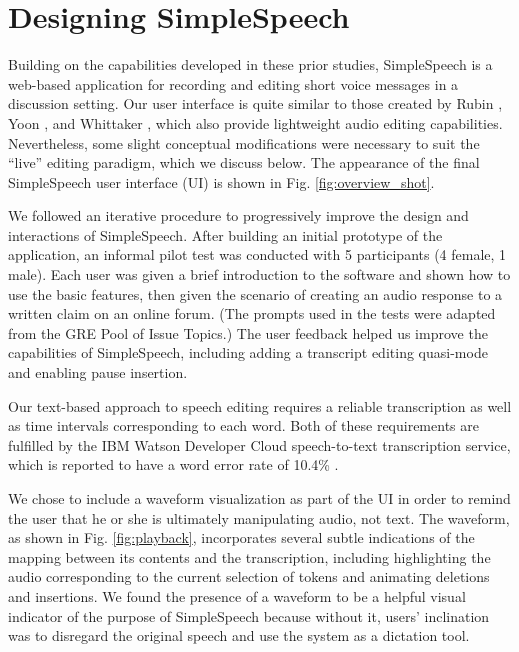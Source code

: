 \section{Designing SimpleSpeech}
Building on the capabilities developed in these prior studies, SimpleSpeech is a web-based application for recording and editing short voice messages in a discussion setting.
Our user interface is quite similar to those created by Rubin \cite{rubin}, Yoon \cite{yoon}, and Whittaker \cite{whittaker_semantic}, which also provide lightweight audio editing capabilities.
Nevertheless, some slight conceptual modifications were necessary to suit the ``live'' editing paradigm, which we discuss below.
The appearance of the final SimpleSpeech user interface (UI) is shown in Fig. \ref{fig:overview_shot}.

We followed an iterative procedure to progressively improve the design and interactions of SimpleSpeech.
After building an initial prototype of the application, an informal pilot test was conducted with 5 participants (4 female, 1 male). 
Each user was given a brief introduction to the software and shown how to use the basic features, then given the scenario of creating an audio response to a written claim on an online forum. 
(The prompts used in the tests were adapted from the GRE Pool of Issue Topics.)
The user feedback helped us improve the capabilities of SimpleSpeech, including adding a transcript editing quasi-mode and enabling pause insertion.

Our text-based approach to speech editing requires a reliable transcription as well as time intervals corresponding to each word.
Both of these requirements are fulfilled by the IBM Watson Developer Cloud speech-to-text transcription service, which is reported to have a word error rate of 10.4\% \cite{soltau:2014}.

 We chose to include a waveform visualization as part of the UI in order to remind the user that he or she is ultimately manipulating audio, not text. 
The waveform, as shown in Fig. \ref{fig:playback}, incorporates several subtle indications of the mapping between its contents and the transcription, including highlighting the audio corresponding to the current selection of tokens and animating deletions and insertions.
We found the presence of a waveform to be a helpful visual indicator of the purpose of SimpleSpeech because without it, users' inclination was to disregard the original speech and use the system as a dictation tool.

